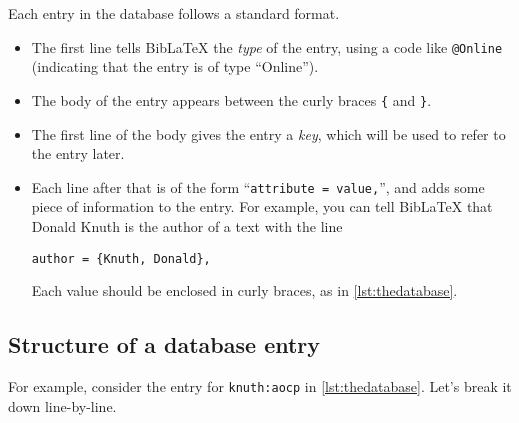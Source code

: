 \documentclass{article}
\newcommand*{\code}[1]{\texttt{#1}}
\begin{document}


Each entry in the database follows a standard format.
\begin{itemize}
\item The first line tells Bib\LaTeX{} the \emph{type} of the entry, using a code like \code{{@}Online} (indicating that the entry is of type \enquote{Online}).

\item
  The body of the entry appears between the curly braces \code{\{} and \code{\}}.

\item
  The first line of the body gives the entry a \emph{key}, which will be used to refer to the entry later.

\item
  Each line after that is of the form \enquote{\code{attribute = value,}}, and adds some piece of information to the entry.
  For example, you can tell Bib\LaTeX{} that Donald Knuth is the author of a text with the line
\begin{verbatim}
author = {Knuth, Donald},
\end{verbatim}
  Each value should be enclosed in curly braces, as in \cref{lst:thedatabase}.
\end{itemize}

\subsection{Structure of a database entry}
\label{s:structure}
For example, consider the entry for \code{knuth:aocp} in \cref{lst:thedatabase}.
Let's break it down line-by-line.
\end{document}
